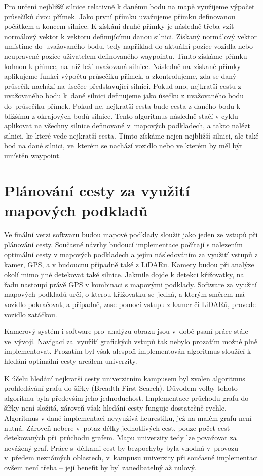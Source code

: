 \documentclass[czech, bachelor]{diploma}
\begin{document}
Pro určení nejbližší silnice relativně k danému bodu na mapě využijeme výpočet průsečíků dvou přímek\cite{
line-line-intersection-source}. Jako první přímku uvažujeme přímku definovanou počátkem a koncem silnice. K získání druhé přímky
je následně třeba vzít normálový vektor k vektoru definujícímu danou silnici. Získaný normálový vektor umístíme do~uvažovaného
bodu, tedy například do aktuální pozice vozidla nebo neupravené pozice uživatelem definovaného waypointu. Tímto získáme přímku
kolmou k přímce, na~níž leží uvažovaná silnice. Následně na~získané přímky aplikujeme funkci výpočtu průsečíku přímek,
a zkontrolujeme, zda se daný průsečík nachází na úsečce představující silnici. Pokud ano, nejkratší cestu z uvažovaného bodu
k~dané silnici definujeme jako úsečku z uvažovaného bodu do~průsečíku přímek. Pokud ne, nejkratší cesta bude cesta z daného bodu
k bližšímu z okrajových bodů silnice. Tento algoritmus následně stačí v cyklu aplikovat na všechny silnice definované v~mapových
podkladech, a takto nalézt silnici, ke které vede nejkratší cesta. Tímto získáme nejen nejbližší silnici, ale také bod na dané
silnici, ve~kterém se nachází vozidlo nebo ve kterém by měl být umístěn waypoint.

\section{Plánování cesty za využití mapových podkladů}

Ve finální verzi softwaru budou mapové podklady sloužit jako jeden ze vstupů při plánování cesty. Současné návrhy budoucí
implementace počítají s nalezením optimální cesty v mapových podkladech a jejím následováním za využití vstupů z kamer, GPS,
a v budoucnu případně také z LiDARu. Kamery budou při analýze okolí mimo jiné detekovat také silnice. Jakmile dojde k detekci
křižovatky, na řadu nastoupí právě GPS v kombinaci s mapovými podklady. Software za využití mapových podkladů určí, o kterou
křižovatku se~jedná, a kterým směrem má vozidlo pokračovat, a případně, zase pomocí vstupu z kamer či LiDARů, provede vozidlo
zatáčkou.

Kamerový systém i software pro~analýzu obrazu jsou v~době psaní práce stále ve~vývoji. Navigaci za~využití grafických vstupů
tak nebylo prozatím možné plně implementovat. Prozatím byl však alespoň implementován algoritmus sloužící k hledání optimální
cesty areálem univerzity.

K účelu hledání nejkratší cesty univerzitním kampusem byl zvolen algoritmus prohledávání grafu do šířky (Breadth First
Search)\cite{bfs-source}.  Důvodem volby tohoto algoritmu byla především jeho jednoduchost. Implementace průchodu grafu do šířky
není složitá, zároveň však hledání cesty funguje dostatečně rychle. Algoritmus v dané implementaci nevyužívá heurestiku, jež
na malém grafu není nutná. Zároveň nebere v~potaz délky jednotlivých cest, pouze počet cest detekovaných při~průchodu grafem. Mapu
univerzity tedy lze považovat za nevážený graf. Práce s~délkami cest by bezpochyby byla vhodná v~provozu v~předem neznámých
oblastech, v~kampusu univerzity při současné implementaci ovšem není třeba -- její benefit by byl zanedbatelný až nulový.
\end{document}
